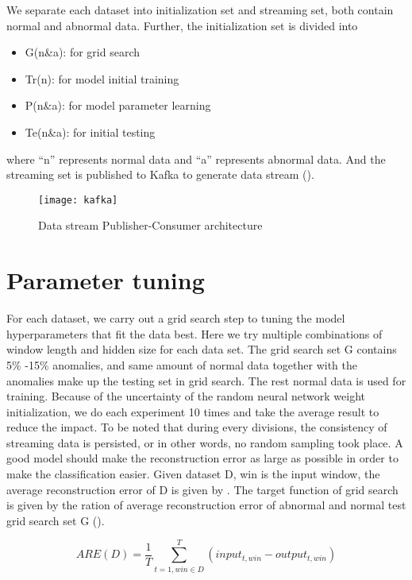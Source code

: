 We separate each dataset into initialization set and streaming set, both contain normal and abnormal data. Further, the initialization set is divided into 
\begin{itemize}
\item G(n\&a): for grid search
\item Tr(n): for model initial training
\item P(n\&a): for model parameter learning
\item Te(n\&a): for initial testing
\end{itemize}
where “n” represents normal data and “a” represents abnormal data. And the streaming set is published to Kafka to generate data stream ().

\begin{figure}[h]
\centering
\texttt{[image: kafka]}
\caption[Data stream Publisher-Consumer architecture]{Data stream Publisher-Consumer architecture}
\label{fig:kafka}
\end{figure}


\section{Parameter tuning}
\label{sec:parametertuning}

For each dataset, we carry out a grid search step to tuning the model hyperparameters that fit the data best. Here we try multiple combinations of window length and hidden size for each data set. The grid search set G contains 5\% -15\% anomalies, and same amount of normal data together with the anomalies make up the testing set in grid search. The rest normal data is used for training. Because of the uncertainty of the random neural network weight initialization, we do each experiment 10 times and take the average result to reduce the impact. To be noted that during every divisions, the consistency of streaming data is persisted, or in other words, no random sampling took place. A good model should make the reconstruction error as large as possible in order to make the classification easier. Given dataset D,  win is the input window, the average reconstruction error of D is given by . The target function of grid search is given by the ration of average reconstruction error of abnormal and normal test grid search set G ().

\begin{equation}\label{eq:are}
ARE(D) = \frac{1}{T}\sum_{t=1,win\in D}^{T}(input_{t,win}-output_{t,win})
\end{equation}

